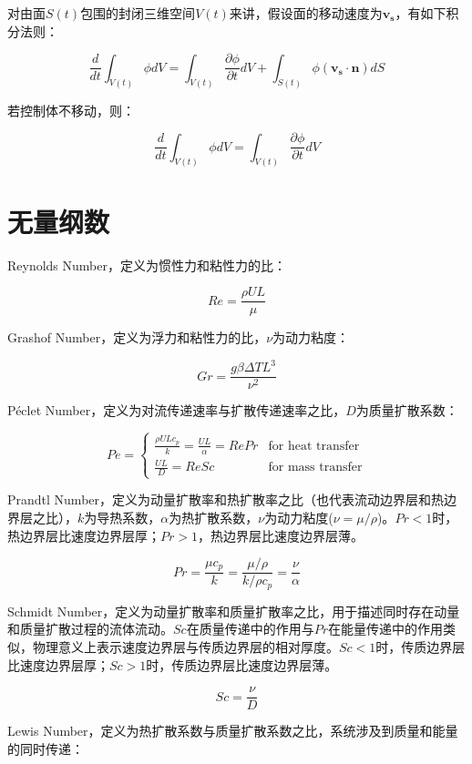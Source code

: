 对由面$ S(t) $包围的封闭三维空间$ V(t) $来讲，假设面的移动速度为$ \mathbf{v_s} $，有如下积分法则：

\begin{equation}
    \frac{d}{dt} \int_{V(t)} \phi dV = \int_{V(t)} \frac{\partial \phi}{\partial t} dV + \int_{S(t)} \phi(\mathbf{v_s}\cdot \mathbf{n}) dS
\end{equation}

若控制体不移动，则：

\begin{equation}\label{Leibniz}
\frac{d}{dt} \int_{V(t)} \phi dV = \int_{V(t)} \frac{\partial \phi}{\partial t} dV
\end{equation}


\section{无量纲数}\label{dimensionless-number}

Reynolds Number，定义为惯性力和粘性力的比：

\[ Re = \frac{\rho UL}{\mu} \]

Grashof Number，定义为浮力和粘性力的比，$ \nu $为动力粘度：

\[ Gr = \frac{g\beta\Delta TL^3}{\nu^2} \]

P\'{e}clet Number，定义为对流传递速率与扩散传递速率之比，$ D $为质量扩散系数：

\[ Pe =
\begin{cases}
\frac{\rho ULc_p}{k} = \frac{UL}{\alpha} = RePr & \text{for heat transfer}\\
\frac{UL}{D} = ReSc & \text{for mass transfer}
\end{cases}
\]

Prandtl Number，定义为动量扩散率和热扩散率之比（也代表流动边界层和热边界层之比），$ k $为导热系数，$ \alpha $为热扩散系数，$ \nu $为动力粘度($ \nu = \mu/\rho $)。$ Pr<1 $时，热边界层比速度边界层厚；$ Pr>1 $，热边界层比速度边界层薄。

\[ Pr = \frac{\mu c_p}{k} = \frac{\mu/\rho}{k/\rho c_p} = \frac{\nu}{\alpha} \]

Schmidt Number，定义为动量扩散率和质量扩散率之比，用于描述同时存在动量和质量扩散过程的流体流动。$ Sc $在质量传递中的作用与$ Pr $在能量传递中的作用类似，物理意义上表示速度边界层与传质边界层的相对厚度。$ Sc<1 $时，传质边界层比速度边界层厚；$ Sc>1 $时，传质边界层比速度边界层薄。

\[ Sc = \frac{\nu}{D} \]

Lewis Number，定义为热扩散系数与质量扩散系数之比，系统涉及到质量和能量的同时传递：

